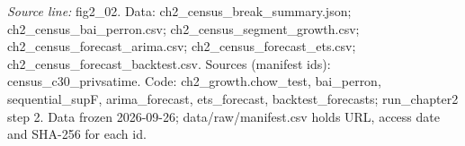 {\scriptsize\textit{Source line:} fig2\_\allowbreak{}02. Data: ch2\_\allowbreak{}census\_\allowbreak{}break\_\allowbreak{}summary.json; ch2\_\allowbreak{}census\_\allowbreak{}bai\_\allowbreak{}perron.csv; ch2\_\allowbreak{}census\_\allowbreak{}segment\_\allowbreak{}growth.csv; ch2\_\allowbreak{}census\_\allowbreak{}forecast\_\allowbreak{}arima.csv; ch2\_\allowbreak{}census\_\allowbreak{}forecast\_\allowbreak{}ets.csv; ch2\_\allowbreak{}census\_\allowbreak{}forecast\_\allowbreak{}backtest.csv. Sources (manifest ids): census\_\allowbreak{}c30\_\allowbreak{}privsatime. Code: ch2\_\allowbreak{}growth.chow\_\allowbreak{}test, bai\_\allowbreak{}perron, sequential\_\allowbreak{}supF, arima\_\allowbreak{}forecast, ets\_\allowbreak{}forecast, backtest\_\allowbreak{}forecasts; run\_\allowbreak{}chapter2 step 2. Data frozen 2026-09-26; data/raw/manifest.csv holds URL, access date and SHA-256 for each id.}